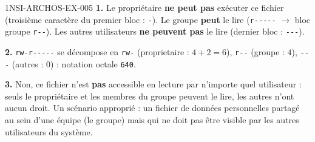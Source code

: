 \begin{corrige}{1NSI-ARCHOS-EX-005}
\textbf{1.} Le propriétaire \textbf{ne peut pas} exécuter ce fichier (troisième caractère
du premier bloc : \lstinline{-}). Le groupe \textbf{peut} le lire (\lstinline{r-----} $\to$
bloc groupe \lstinline{r--}). Les autres utilisateurs \textbf{ne peuvent pas} le lire
(dernier bloc : \lstinline{---}).

\textbf{2.} \lstinline{rw-r-----} se décompose en \lstinline{rw-} (proprietaire :
$4+2=6$), \lstinline{r--} (groupe : $4$), \lstinline{---} (autres : $0$) : notation
octale \lstinline{640}.

\textbf{3.} Non, ce fichier n'est \textbf{pas} accessible en lecture par n'importe quel
utilisateur : seuls le propriétaire et les membres du groupe peuvent le lire, les
\og autres \fg{} n'ont aucun droit. Un scénario approprié : un fichier de données
personnelles partagé au sein d'une équipe (le groupe) mais qui ne doit pas être visible par
les autres utilisateurs du système.
\end{corrige}
